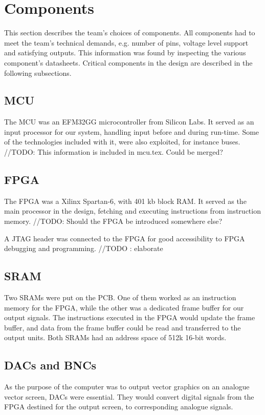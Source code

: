 \section{Components}
This section describes the team's choices of components.
All components had to meet the team's technical demands, e.g. number of pins, voltage level support and satisfying outputs.
This information was found by inspecting the various component's datasheets.
Critical components in the design are described in the following subsections.

\subsection{MCU}
The MCU was an EFM32GG microcontroller from Silicon Labs. 
It served as an input processor for our system, handling input before and during run-time. 
Some of the technologies included with it, were also exploited, for instance buses. 
//TODO: This information is included in mcu.tex. Could be merged?

\subsection{FPGA}
The FPGA was a Xilinx Spartan-6, with 401 kb block RAM. 
It served as the main processor in the design, fetching and executing instructions from instruction memory.
//TODO: Should the FPGA be introduced somewhere else?

A JTAG header was connected to the FPGA for good accessibility to FPGA debugging and programming.
//TODO : elaborate

\subsection{SRAM}
Two SRAMs were put on the PCB. 
One of them worked as an instruction memory for the FPGA, while the other was a dedicated frame buffer for our output signals. 
The instructions executed in the FPGA would update the frame buffer, and data from the frame buffer could be read and transferred to the output units. 
Both SRAMs had an address space of 512k 16-bit words. 

\subsection{DACs and BNCs}
As the purpose of the computer was to output vector graphics on an analogue vector screen, DACs were essential.
They would convert digital signals from the FPGA destined for the output screen, to corresponding analogue signals.

